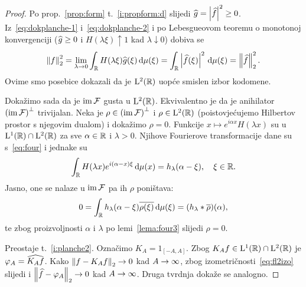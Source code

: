 \documentclass[main.tex]{subfiles}
\begin{document}
\begin{proof}
	Po prop.~\ref{prop:form} t.~\ref{i:propform:d} slijedi
	\( \widehat{g} = \left| {\widehat{f}} \right|^2 \ge 0 \). Iz~\eqref{eq:dokplanche-1}
	i~\eqref{eq:dokplanche-2} i po Lebesgueovom teoremu o monotonoj
	konvergenciji (\( \widehat{g} \ge 0 \) i \( H(\lambda\xi) \uparrow 1 \) kad \( \lambda \downarrow 0 \))
	dobiva se
	\begin{equation}
		\left\lVert f\right\rVert_2^2 = \lim\limits_{\lambda \rightarrow 0}
		\int_{\mathbb{R}} H(\lambda\xi)\widehat{g}(\xi) \,\mathrm d \mu(\xi)
		= \int_{\mathbb{R}} \left| {\widehat{f}(\xi)} \right| ^2 \,\mathrm d \mu(\xi) = \left\lVert\widehat{f}\right\rVert_2^2.
	\end{equation}
	Ovime smo posebice dokazali da je \( \mathrm{L}^2(\mathbb{R}) \) uopće smislen
	izbor kodomene.

	Dokažimo sada da je \( \operatorname{im} \mathcal F \) gusta u \( \mathrm{L}^2(\mathbb{R}) \).
	Ekvivalentno je da je anihilator \( \left(\operatorname{im} \mathcal F\right) ^{{\perp}} \) trivijalan.
	Neka je \( \rho \in {\left( \operatorname{im}\mathcal F \right)^{\perp}}\) i
	\( \rho \in \mathrm{L}^2(\mathbb{R}) \) (poistovjećujemo Hilbertov prostor s njegovim dualom)
	i dokažimo \( \rho = 0 \).
	Funkcije \( x \mapsto e^{i\alpha x}H(\lambda x) \) su u \( \mathrm{L}^1(\mathbb{R}) \cap \mathrm{L}^2(\mathbb{R}) \)
	za sve \( \alpha \in \mathbb{R} \) i \( \lambda > 0 \). Njihove Fourierove transformacije
	dane su s~\eqref{eq:four} i jednake su
	\begin{equation}
		\int_{\mathbb{R}} H(\lambda x) e^{i(\alpha-x)\xi} \,\mathrm d \mu(x) = h_\lambda(\alpha-\xi), \quad \xi \in \mathbb{R}.
	\end{equation}
	Jasno, one se nalaze u \( \operatorname{im} \mathcal F \) pa ih \( \rho \)
	poništava:
	\begin{equation}
		0=\int_{\mathbb{R}} h_\lambda(\alpha - \xi) \overline{\rho(\xi)} \,\mathrm d \mu(\xi) =
		(h_\lambda * \overline{\rho})(\alpha),
	\end{equation}
	te zbog proizvoljnosti \( \alpha \) i \( \lambda \) po
	lemi~\ref{lema:four3} slijedi \( \rho = 0 \).

	\newcommand{\tempjj}{1_{\left[ -A,A \right]}}
	\newcommand{\tempj}{K_A}
	Preostaje t.~\ref{i:planche2}. Označimo \( \tempj = \tempjj \).
	Zbog \( \tempj f \in \L^1(\R) \cap \L^2(\R) \) je
	\( \varphi_A = \wh{\tempj f} \).
	Kako \( \norm{f-\tempj f}_2 \un \) kad \( A \rightarrow \infty \),
	zbog izometričnosti~\eqref{eq:fl2izo} slijedi
	i \( \left\lVert\widehat{f} - \varphi_A\right\rVert_2 \rightarrow 0 \) kad \( A \rightarrow \infty \).
	Druga tvrdnja dokaže se analogno.
\end{proof}
\end{document}
